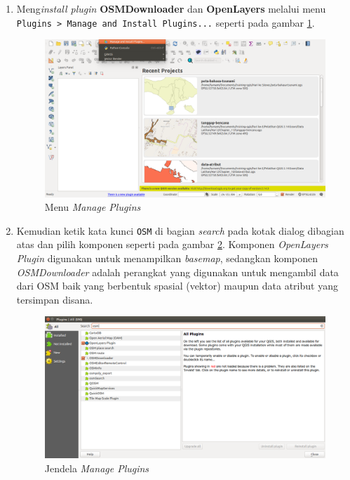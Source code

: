 \begin{enumerate}[1.]
  \item Meng\textit{install plugin} \textbf{OSMDownloader} dan \textbf{OpenLayers} melalui menu \texttt{Plugins > Manage and Install Plugins...} seperti pada gambar \ref{fig:managepluginsmenu}.
  
  \begin{figure}[H]
    \centering
    \includegraphics[width=1\textwidth]{./resources/001-manage-plugins-menu}
    \caption{Menu \textit{Manage Plugins}}
    \label{fig:managepluginsmenu}
  \end{figure}
  
  \item Kemudian ketik kata kunci \texttt{OSM} di bagian \textit{search} pada kotak dialog dibagian atas dan pilih komponen seperti pada gambar \ref{fig:osminstallwin}. Komponen \textit{OpenLayers Plugin} digunakan untuk menampilkan \textit{basemap}, sedangkan komponen \textit{OSMDownloader} adalah perangkat yang digunakan untuk mengambil data dari OSM baik yang berbentuk spasial (vektor) maupun data atribut yang tersimpan disana.
  
  \begin{figure}[H]
    \centering
    \includegraphics[width=1\textwidth]{./resources/002-osm-install-win}
    \caption{Jendela \textit{Manage Plugins}}
    \label{fig:osminstallwin}
  \end{figure}
  

\end{enumerate}
